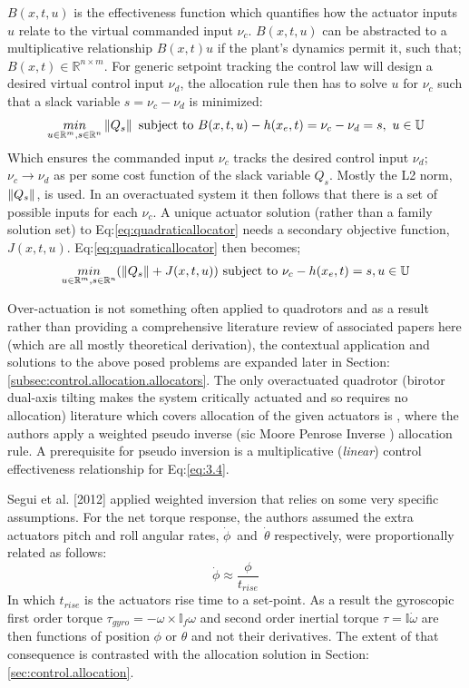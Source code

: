 $B(x,t,u)$ is the effectiveness function which quantifies how the actuator inputs $u$ relate to the virtual commanded input $\nu_c$. $B(x,t,u)$ can be abstracted to a multiplicative relationship $B(x,t)u$ if the plant's dynamics permit it, such that; $B(x,t)\in\mathbb{R}^{n\times m}$. For generic setpoint tracking the control law will design a desired virtual control input $\nu_d$, the allocation rule then has to solve $u$ for $\nu_c$ such that a slack variable $s=\nu_c-\nu_d$ is minimized:
\begin{equation}\label{eq:quadraticallocator}
\underset{u \in \mathbb{R}^m ,s \in \mathbb{R}^n}{min}\left\lVert Q_s\right\rVert ~\text{subject to} ~B(x,t,u) - h(x_e,t)=\nu_c-\nu_d=s,~u \in \mathbb{U}
\end{equation}
Which ensures the commanded input $\nu_c$ tracks the desired control input $\nu_d$; $\nu_c\rightarrow\nu_d$ as per some cost function of the slack variable $Q_s$. Mostly the L2 norm, $\left\lVert Q_s\right\rVert$, is used. In an overactuated system it then follows that there is a set of possible inputs for each $\nu_c$. A unique actuator solution (rather than a family solution set) to Eq:\ref{eq:quadraticallocator} needs a secondary objective function, $J(x,t,u)$. Eq:\ref{eq:quadraticallocator} then becomes;
\begin{equation} \label{eq:quadraticallocatorcost}
\underset{u \in \mathbb{R}^m ,s \in \mathbb{R}^n}{min}(\left\lVert Q_s\right\rVert+J(x,t,u)) ~\text{subject to} ~\nu_c - h(x_e,t)=s, u \in \mathbb{U}
\end{equation}
\par
Over-actuation is not something often applied to quadrotors and as a result rather than providing a comprehensive literature review of associated papers here (which are all mostly theoretical derivation), the contextual application and solutions to the above posed problems are expanded later in Section: \ref{subsec:control.allocation.allocators}. The only overactuated quadrotor (birotor dual-axis tilting makes the system critically actuated and so requires no allocation) literature which covers allocation of the given actuators is \cite{tiltgasco,tiltrihani}, where the authors apply a weighted pseudo inverse (sic Moore Penrose Inverse \cite{moorepenrose}) allocation rule. A prerequisite for pseudo inversion is a multiplicative (\emph{linear}) control effectiveness relationship for Eq:\ref{eq:3.4}. 
\par
Segui et al. [2012] applied weighted inversion that relies on some very specific assumptions. For the net torque response, the authors assumed the extra actuators pitch and roll angular rates, $\dot{\phi}$~and~$\dot{\theta}$ respectively, were proportionally related as follows:
\begin{equation}
\dot{\phi}\approx\frac{\phi}{t_{rise}}
\end{equation}
In which $t_{rise}$ is the actuators rise time to a set-point. As a result the gyroscopic first order torque $\tau_{gyro}=-\omega\times\mathbb{I}_f\omega$ and second order inertial torque $\tau=\mathbb{I}\dot{\omega}$ are then functions of position $\phi$ or $\theta$ and not their derivatives. The extent of that consequence is contrasted with the allocation solution in Section:\ref{sec:control.allocation}.

